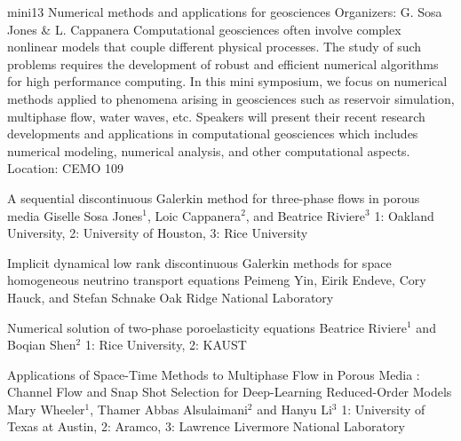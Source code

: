 \mini
{mini13}
{Numerical methods and applications for geosciences}
{Organizers: G. Sosa Jones \& L. Cappanera}
{Computational geosciences often involve complex nonlinear models that couple different physical processes. The study of such problems requires the development of robust and efficient numerical algorithms for high performance computing. In this mini symposium, we focus on numerical methods applied to phenomena arising in geosciences such as reservoir simulation, multiphase flow, water waves, etc. Speakers will present their recent research developments and applications in computational geosciences which includes numerical modeling, numerical analysis, and other computational aspects.}
{Location: CEMO 109}

\begin{talks}
\item\talk
{A sequential discontinuous Galerkin method for three-phase flows in porous media}
{Giselle Sosa Jones$^{1}$, Loic Cappanera$^{2}$, and Beatrice Riviere$^{3}$}
{1: Oakland University, 2: University of Houston, 3: Rice University}
\item\talk
{Implicit dynamical low rank discontinuous Galerkin methods for space homogeneous neutrino transport equations}
{Peimeng Yin, Eirik Endeve, Cory Hauck, and Stefan Schnake}
{Oak Ridge National Laboratory}
\item\talk
{Numerical solution of two-phase poroelasticity equations}
{Beatrice Riviere$^{1}$ and Boqian Shen$^{2}$}
{1: Rice University, 2: KAUST}
\item\talk
{Applications of Space-Time Methods to Multiphase Flow in Porous Media  :  Channel Flow and  Snap Shot Selection for Deep-Learning Reduced-Order Models }
{Mary Wheeler$^{1}$, Thamer  Abbas Alsulaimani$^{2}$ and Hanyu Li$^{3}$}
{1: University of Texas at Austin, 2: Aramco, 3: Lawrence Livermore National Laboratory}
\end{talks}
\room
